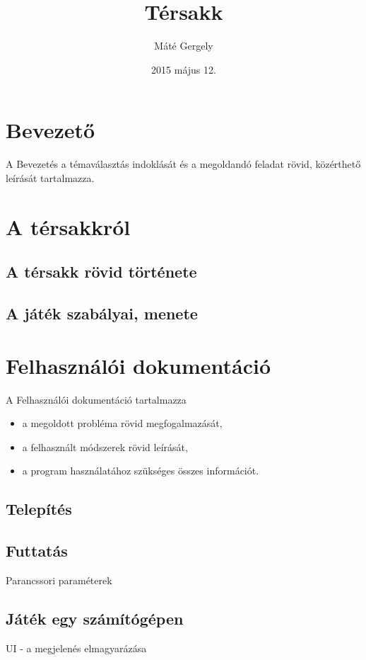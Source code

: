 \documentclass[12pt]{report}
\title{Térsakk}
\author{Máté Gergely}
\date{2015 május 12.}
\begin{document}
\maketitle
\tableofcontents

\chapter{Bevezető}

A Bevezetés a témaválasztás indoklását és a megoldandó feladat rövid, közérthető leírását tartalmazza.

\chapter {A térsakkról}

\section{A térsakk rövid története}

\section{A játék szabályai, menete}


\chapter{Felhasználói dokumentáció}

A Felhasználói dokumentáció tartalmazza 
\begin{itemize}
\item a megoldott probléma rövid megfogalmazását,
\item a felhasznált módszerek rövid leírását, 
\item a program használatához szükséges összes információt.
\end{itemize}

\section{Telepítés}

\section{Futtatás}	
Parancssori paraméterek

\section{Játék egy számítógépen}
UI - a megjelenés elmagyarázása
\end{document}
